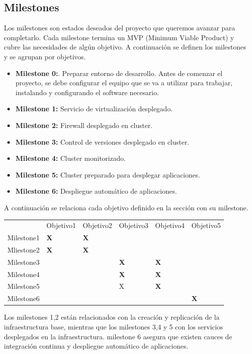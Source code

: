 \subsection{Milestones}
\label{Milestones}
\begin{text}
	Los milestones son estados deseados del proyecto que queremos avanzar para completarlo. Cada milestone termina un MVP (Minimum Viable Product) y cubre las necesidades de algún objetivo. A continuación se definen los milestones y se agrupan por objetivos.
	
	\begin{itemize}
		\item \textbf{Milestone 0:}. Preparar entorno de desarrollo. Antes de comenzar el proyecto, se debe configurar el equipo que se va a utilizar para trabajar, instalando y configurando el software necesario. 
		\item \textbf{Milestone 1:} Servicio de virtualización desplegado. 
		\item \textbf{Milestone 2:} Firewall desplegado en cluster.
		\item \textbf{Milestone 3:} Control de versiones desplegado en cluster.
		\item \textbf{Milestone 4:} Cluster monitorizado.
		\item \textbf{Milestone 5:} Cluster preparado para desplegar aplicaciones.
		\item \textbf{Milestone 6:} Despliegue automático de aplicaciones.
	\end{itemize}
	A continuación se relaciona cada objetivo definido en la sección  con su milestone.
	
	
	\begin{table}[!hbt]
		\begin{tabular}{llllll}
			& Objetivo1         & Objetivo2         & Objetivo3         & Objetivo4         & Objetivo5         \\
			Milestone1 & \textbf{X} & \textbf{X} & \textbf{}  &            &            \\
			Mliestone2 & \textbf{X} & \textbf{X} &            &            &            \\
			Milestone3 &            &            & \textbf{X} & \textbf{X} &            \\
			Milestone4 &            &            & \textbf{X} & \textbf{X} &            \\
			Milestone5 &            &            & X          & \textbf{X} &            \\
			Milestone6 &            &            &            &            & \textbf{X}
		\end{tabular}
	\end{table}
	
	Los milestones 1,2 están relacionados con la creación y replicación de la infraestructura base, mientras que los milestones 3,4 y 5 con los servicios desplegados en la infraestructura. milestone 6 asegura que existen cauces de integración continua y despliegue automático de aplicaciones.
	
\end{text}

